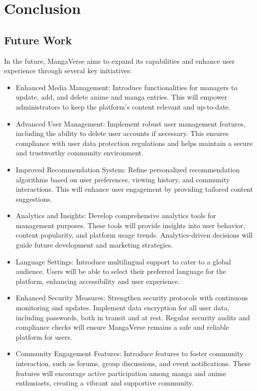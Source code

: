 \chapter{Conclusion}


\section{Future Work}

In the future, MangaVerse aims to expand its capabilities and enhance user experience through several key initiatives:

\begin{itemize}
\item Enhanced Media Management: Introduce functionalities for managers to update, add, and delete anime and manga entries. This will empower administrators to keep the platform's content relevant and up-to-date.

\item Advanced User Management: Implement robust user management features, including the ability to delete user accounts if necessary. This ensures compliance with user data protection regulations and helps maintain a secure and trustworthy community environment.

\item Improved Recommendation System: Refine personalized recommendation algorithms based on user preferences, viewing history, and community interactions. This will enhance user engagement by providing tailored content suggestions.

\item Analytics and Insights: Develop comprehensive analytics tools for management purposes. These tools will provide insights into user behavior, content popularity, and platform usage trends. Analytics-driven decisions will guide future development and marketing strategies.

\item Language Settings: Introduce multilingual support to cater to a global audience. Users will be able to select their preferred language for the platform, enhancing accessibility and user experience.

\item Enhanced Security Measures: Strengthen security protocols with continuous monitoring and updates. Implement data encryption for all user data, including passwords, both in transit and at rest. Regular security audits and compliance checks will ensure MangaVerse remains a safe and reliable platform for users.

\item Community Engagement Features: Introduce features to foster community interaction, such as forums, group discussions, and event notifications. These features will encourage active participation among manga and anime enthusiasts, creating a vibrant and supportive community.
\end{itemize}

